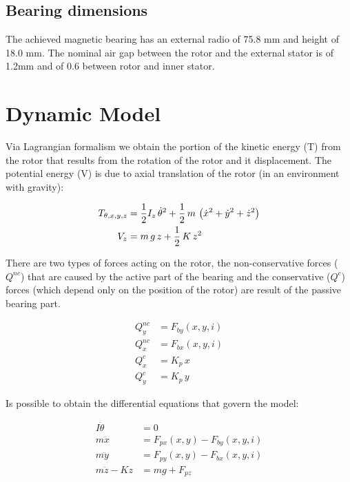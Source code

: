 \documentclass[10pt,fleqn,a4paper,twoside]{article}
\begin{document}
	\subsection{Bearing dimensions}
	
	The achieved magnetic bearing has an external radio of 75.8 mm and height of 18.0 mm. The nominal air gap between the rotor and the external stator is of 1.2mm and of 0.6 between rotor and inner stator. 
	
	\section{Dynamic Model}
	
	Via Lagrangian formalism we obtain the portion of the kinetic energy (T) from the rotor that results from the rotation of the rotor and it displacement. The potential energy (V) is due to axial translation of the rotor (in an environment with gravity): 
	
	\begin{align}
		T_{\theta, x, y, z} &= \frac{1}{2} I_z \, \dot{\theta}^2 + \frac{1}{2} \, m \, \left( \dot{x}^2 + \dot{y}^2 + \dot{z}^2 \right) \notag \\
		V_z &= m \, g \, z + \frac{1}{2} \, K \, z^2
	\end{align}
	
	There are two types of forces acting on the rotor, the  non-conservative forces ($Q^{nc}$) that are caused by the active part of the bearing and the conservative ($Q^{c}$) forces (which depend only on the position of the rotor) are result of the passive bearing part.
	
	\begin{align}
		Q_y^{nc} &= F_{by}(x,y,i)  \\
		Q_x^{nc} &= F_{bx}(x,y,i)  \\
		Q^{c}_x &= K_p \, x \\
		Q^{c}_y &= K_p \, y 
	\end{align}
	
	Is possible to obtain the differential equations that govern the model:
		
	\begin{align}
		I \ddot{\theta} &= 0 \\
		m \ddot{x}		&=  F_{px}(x,y) - F_{by}(x,y,i) \\
		m \ddot{y}		&=  F_{py}(x,y) - F_{bx}(x,y,i)\\	
		m \ddot{z} - K z &= m g  + F_{pz}
	\end{align}
	
\end{document}
